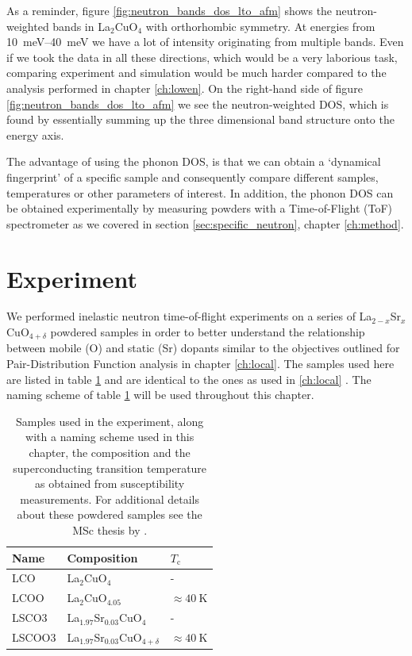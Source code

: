 As a reminder, figure \ref{fig:neutron_bands_dos_lto_afm} shows the neutron-weighted bands in La$_2$CuO$_4$ with orthorhombic symmetry. At energies from \SIrange{10}{40}{\milli\eV} we have a lot of intensity originating from multiple bands. Even if we took the data in all these directions, which would be a very laborious task, comparing experiment and simulation would be much harder compared to the analysis performed in chapter \ref{ch:lowen}. On the right-hand side of figure \ref{fig:neutron_bands_dos_lto_afm} we see the neutron-weighted DOS, which is found by essentially summing up the three dimensional band structure onto the energy axis.

The advantage of using the phonon DOS, is that we can obtain a `dynamical fingerprint' of a specific sample and consequently compare different samples, temperatures or other parameters of interest. In addition, the phonon DOS can be obtained experimentally by measuring powders with a Time-of-Flight (ToF) spectrometer as we covered in section \ref{sec:specific_neutron}, chapter \ref{ch:method}.

\section{Experiment}
We performed inelastic neutron time-of-flight experiments on a series of La$_{2-x}$Sr$_{x}$CuO$_{4+\delta}$ powdered samples in order to better understand the relationship between mobile (O) and static (Sr) dopants similar to the objectives outlined for Pair-Distribution Function analysis in chapter \ref{ch:local}. The samples used here are listed in table \ref{tab:in4_samples} and are identical to the ones as used in \ref{ch:local} \cite{Ahmad2019MSc}. The naming scheme of table \ref{tab:in4_samples} will be used throughout this chapter.

\begin{table}
    \caption{Samples used in the experiment, along with a naming scheme used in this chapter, the composition and the superconducting transition temperature as obtained from susceptibility measurements. For additional details about these powdered samples see the MSc thesis by \citeauthor{Ahmad2019MSc} \cite{Ahmad2019MSc}.}
    \label{tab:in4_samples}
    \centering
    \begin{tabular}{lll}
    \toprule
      Name &                             Composition &                $T_\text{c}$ \\
    \midrule
       LCO &                           La$_2$CuO$_4$ &                           - \\
      LCOO &                      La$_2$CuO$_{4.05}$ &  $\approx \SI{40}{\kelvin}$ \\
     LSCO3 &           La$_{1.97}$Sr$_{0.03}$CuO$_4$ &                           - \\
     LSCOO3 &  La$_{1.97}$Sr$_{0.03}$CuO$_{4+\delta}$ &  $\approx \SI{40}{\kelvin}$ \\
    \bottomrule
    \end{tabular}
\end{table}


